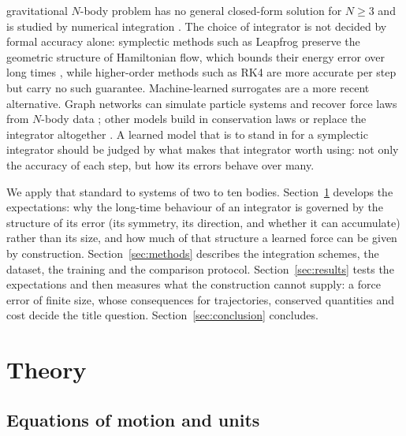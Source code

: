 \documentclass[a4paper,journal]{IEEEtran}
\begin{document}
 gravitational $N$-body problem has no general closed-form solution for $N\ge3$ and is studied by numerical integration \cite{Aarseth2003}. The choice of integrator is not decided by formal accuracy alone: symplectic methods such as Leapfrog preserve the geometric structure of Hamiltonian flow, which bounds their energy error over long times \cite{Hairer2006}, while higher-order methods such as RK4 are more accurate per step but carry no such guarantee. Machine-learned surrogates are a more recent alternative. Graph networks can simulate particle systems \cite{Battaglia2016,SanchezGonzalez2020} and recover force laws from $N$-body data \cite{Cranmer2020}; other models build in conservation laws \cite{Greydanus2019} or replace the integrator altogether \cite{Breen2020}. A learned model that is to stand in for a symplectic integrator should be judged by what makes that integrator worth using: not only the accuracy of each step, but how its errors behave over many.

We apply that standard to systems of two to ten bodies. Section~\ref{sec:theory} develops the expectations: why the long-time behaviour of an integrator is governed by the structure of its error (its symmetry, its direction, and whether it can accumulate) rather than its size, and how much of that structure a learned force can be given by construction. Section~\ref{sec:methods} describes the integration schemes, the dataset, the training and the comparison protocol. Section~\ref{sec:results} tests the expectations and then measures what the construction cannot supply: a force error of finite size, whose consequences for trajectories, conserved quantities and cost decide the title question. Section~\ref{sec:conclusion} concludes.

\section{Theory}\label{sec:theory}

\subsection{Equations of motion and units}\label{sec:eom}
\end{document}
